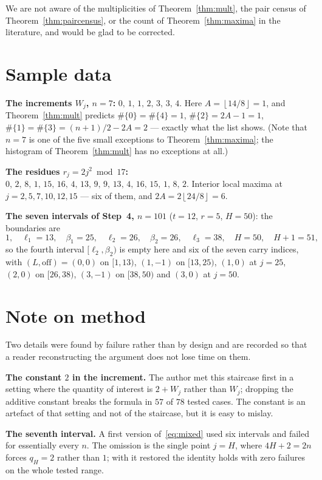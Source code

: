 \documentclass[11pt,reqno]{amsart}
\theoremstyle{plain}
\theoremstyle{remark}
\numberwithin{equation}{section}
\newcommand{\fl}[1]{\left\lfloor #1 \right\rfloor}
\begin{document}
\medskip
We are not aware of the multiplicities of Theorem~\ref{thm:mult}, the pair
census of Theorem~\ref{thm:paircensus}, or the count of
Theorem~\ref{thm:maxima} in the literature, and would be glad to be corrected.

\appendix

\section{Sample data}

\noindent\textbf{The increments $W_j$, $n = 7$:} $0,\,1,\,1,\,2,\,3,\,3,\,4$.
Here $A = \fl{14/8} = 1$, and Theorem~\ref{thm:mult} predicts
$\#\{0\}=\#\{4\}=1$, $\#\{2\}=2A-1=1$, $\#\{1\}=\#\{3\}=(n+1)/2-2A=2$ ---
exactly what the list shows. (Note that $n=7$ is one of the five small
exceptions to Theorem~\ref{thm:maxima}; the histogram of
Theorem~\ref{thm:mult} has no exceptions at all.)

\medskip\noindent\textbf{The residues $r_j = 2j^2 \bmod 17$:}
$0,\,2,\,8,\,1,\,15,\,16,\,4,\,13,\,9,\,9,\,13,\,4,\,16,\,15,\,1,\,8,\,2$.
Interior local maxima at $j = 2,5,7,10,12,15$ --- six of them, and
$2A = 2\fl{24/8} = 6$.

\medskip\noindent\textbf{The seven intervals of Step~4, $n = 101$}
($t = 12$, $r = 5$, $H = 50$): the boundaries are
\[
  1,\quad \ell_1 = 13,\quad \beta_1 = 25,\quad \ell_2 = 26,\quad
  \beta_2 = 26,\quad \ell_3 = 38,\quad H = 50,\quad H+1 = 51,
\]
so the fourth interval $[\ell_2,\beta_2)$ is empty here and six of the seven
carry indices, with $(L,\mathrm{off}) = (0,0)$ on $[1,13)$, $(1,-1)$ on
$[13,25)$, $(1,0)$ at $j=25$, $(2,0)$ on $[26,38)$, $(3,-1)$ on $[38,50)$ and
$(3,0)$ at $j=50$.

\section{Note on method}

Two details were found by failure rather than by design and are recorded so that
a reader reconstructing the argument does not lose time on them.

\medskip\noindent\textbf{The constant $2$ in the increment.} The author met this
staircase first in a setting where the quantity of interest is $2+W_j$ rather
than $W_j$; dropping the additive constant breaks the formula in $57$ of $78$
tested cases. The constant is an artefact of that setting and not of the
staircase, but it is easy to mislay.

\medskip\noindent\textbf{The seventh interval.} A first version
of~\eqref{eq:mixed} used six intervals and failed for essentially every $n$. The
omission is the single point $j = H$, where $4H+2 = 2n$ forces $q_H = 2$ rather
than $1$; with it restored the identity holds with zero failures on the whole
tested range.
\end{document}
